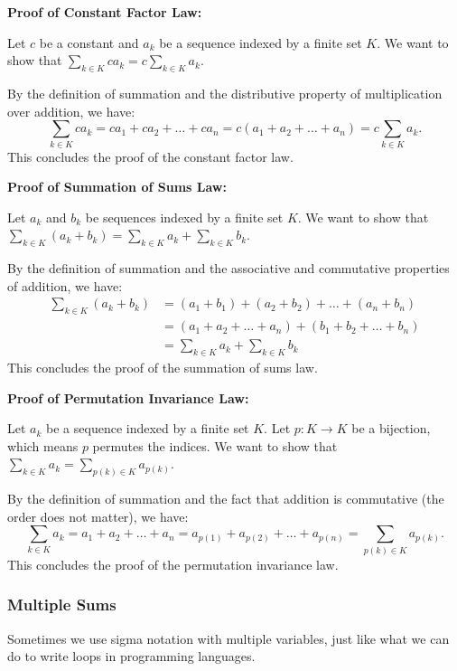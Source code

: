 \textbf{Proof of Constant Factor Law:}

Let \( c \) be a constant and \( a_k \) be a sequence indexed by a finite set \( K \). We want to show that \( \sum_{k \in K} c a_k = c \sum_{k \in K} a_k \).

By the definition of summation and the distributive property of multiplication over addition, we have:
\begin{equation}
    \sum_{k \in K} c a_k = c a_1 + c a_2 + \ldots + c a_n = c (a_1 + a_2 + \ldots + a_n) = c \sum_{k \in K} a_k.
\end{equation}
This concludes the proof of the constant factor law.

\textbf{Proof of Summation of Sums Law:}

Let \( a_k \) and \( b_k \) be sequences indexed by a finite set \( K \). We want to show that \( \sum_{k \in K} (a_k + b_k) = \sum_{k \in K} a_k + \sum_{k \in K} b_k \).

By the definition of summation and the associative and commutative properties of addition, we have:
\begin{equation}
    \begin{split}
\sum_{k \in K} (a_k + b_k) &= (a_1 + b_1) + (a_2 + b_2) + \ldots + (a_n + b_n) \\
&= (a_1 + a_2 + \ldots + a_n) + (b_1 + b_2 + \ldots + b_n) \\
&= \sum_{k \in K} a_k + \sum_{k \in K} b_k
\end{split}
\label{eq:sum_of_sums}
\end{equation}
This concludes the proof of the summation of sums law.

\textbf{Proof of Permutation Invariance Law:}

Let \( a_k \) be a sequence indexed by a finite set \( K \). Let \( p: K \to K \) be a bijection, which means \( p \) permutes the indices. We want to show that \( \sum_{k \in K} a_k = \sum_{p(k) \in K} a_{p(k)} \).

By the definition of summation and the fact that addition is commutative (the order does not matter), we have:
\begin{equation}
    \sum_{k \in K} a_k = a_1 + a_2 + \ldots + a_n = a_{p(1)} + a_{p(2)} + \ldots + a_{p(n)} = \sum_{p(k) \in K} a_{p(k)}.
\end{equation}
This concludes the proof of the permutation invariance law.
\subsubsection{Multiple Sums}
Sometimes we use sigma notation with multiple variables, just like what we can do to write loops in programming languages.

